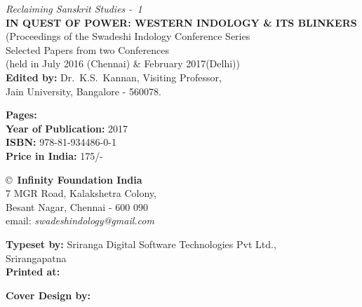 \thispagestyle{empty}
\noindent
{\fontsize{9}{11}\selectfont\sl Reclaiming Sanskrit Studies - 1}\\
{\bf IN QUEST OF POWER: WESTERN INDOLOGY \& ITS BLINKERS}\\ 
(Proceedings of the Swadeshi Indology Conference Series\\
Selected Papers from two Conferences\\ 
(held in July 2016 (Chennai) \& February 2017(Delhi))\\
{\bf Edited by:} Dr.\ K.S.\ Kannan, Visiting Professor,\\ 
Jain University, Bangalore - 560078.
\vfill

\noindent
{\bf Pages:} \pageref{book:end}\\
{\bf Year of Publication:} 2017\\
{\bf ISBN:} 978-81-934486-0-1\\
{\bf Price in India:} 175/-
\vfill

\noindent
\copyright\ {\bf Infinity Foundation India}\\ 
7 MGR Road, Kalakshetra Colony,\\ 
Besant Nagar, Chennai - 600 090\\
email: {\sl swadeshindology@gmail.com} 
\vfill

\noindent
{\bf Typeset by:} Sriranga Digital Software Technologies Pvt Ltd.,\\ 
Srirangapatna\\

\noindent
{\bf Printed at:}

\noindent
{\bf Cover Design by:}
